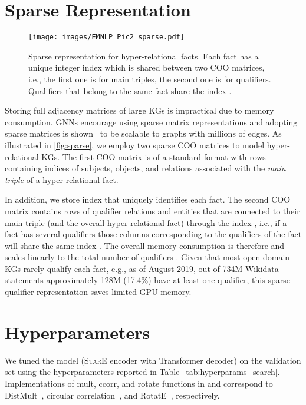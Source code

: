 \documentclass[11pt,a4paper]{article}
\begin{document}
\section{Sparse Representation}
\label{app:sparse}

\begin{figure}[h!]
    \centering
    \texttt{[image: images/EMNLP\_Pic2\_sparse.pdf]}
    \caption{Sparse representation for hyper-relational facts. Each fact has a unique integer index  which is shared between two COO matrices, i.e., the first one is for main triples, the second one is for qualifiers. Qualifiers that belong to the same fact share the index .}
    \label{fig:sparse}
\end{figure}




Storing full adjacency matrices of large KGs is impractical due to  memory consumption.
GNNs encourage using sparse matrix representations and adopting sparse matrices is shown~\citep{Cohen2020Scalable} to be scalable to graphs with millions of edges.
As illustrated in \autoref{fig:sparse}, we employ two sparse COO matrices to model hyper-relational KGs. 
The first COO matrix is of a standard format with rows containing indices of subjects, objects, and relations associated with the \emph{main triple} of a hyper-relational fact.  

In addition, we store index  that uniquely identifies each fact.
The second COO matrix contains rows of qualifier relations  and entities  that are connected to their main triple (and the overall hyper-relational fact) through the index , i.e., 
if a fact has several qualifiers those columns corresponding to the qualifiers of the fact will share the same index
. 
The overall memory consumption is therefore  and scales linearly to the total number of qualifiers . 
Given that most open-domain KGs rarely qualify each fact, e.g., as of August 2019, out of 734M Wikidata statements approximately 128M (17.4\%) have at least one qualifier, this sparse qualifier representation  saves limited GPU memory.





\section{Hyperparameters}
\label{app:hyperparams}



We tuned the model (\textsc{StarE} encoder with Transformer decoder) on the validation set using the hyperparameters reported in Table~\ref{tab:hyperparams_search}.
Implementations of mult, ccorr, and rotate functions in  and  correspond to DistMult~\citep{DBLP:journals/corr/YangYHGD14a}, circular correlation~\citep{DBLP:conf/aaai/NickelRP16}, and RotatE~\citep{DBLP:conf/iclr/SunDNT19}, respectively.
\end{document}
